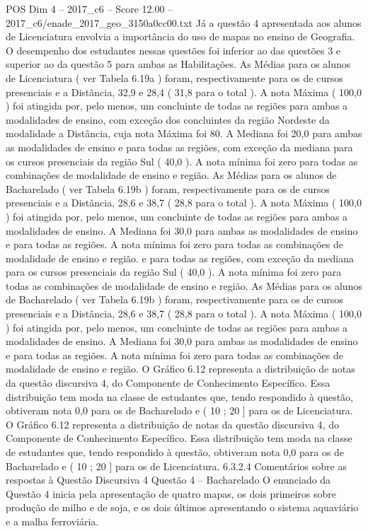 \begin{textsample}{POS Dim 4 – 2017\_c6 – Score 12.00 – 2017\_c6/enade\_2017\_geo\_3150a0cc00.txt}
Já a questão 4 apresentada aos alunos de Licenciatura envolvia a importância do uso de mapas no ensino de Geografia.
O desempenho dos estudantes nessas questões foi inferior ao das questões 3 e superior ao da questão 5 para ambas as Habilitações.
As Médias para os alunos de Licenciatura ( ver Tabela 6.19a ) foram, respectivamente para os de cursos presenciais e a Distância, 32,9 e 28,4 ( 31,8 para o total ).
A nota Máxima ( 100,0 ) foi atingida por, pelo menos, um concluinte de todas as regiões para ambas a modalidades de ensino, com exceção dos concluintes da região Nordeste da modalidade a Distância, cuja nota Máxima foi 80.
A Mediana foi 20,0 para ambas as modalidades de ensino e para todas as regiões, com exceção da mediana para os cursos presenciais da região Sul ( 40,0 ).
A nota mínima foi zero para todas as combinações de modalidade de ensino e região.
As Médias para os alunos de Bacharelado ( ver Tabela 6.19b ) foram, respectivamente para os de cursos presenciais e a Distância, 28,6 e 38,7 ( 28,8 para o total ).
A nota Máxima ( 100,0 ) foi atingida por, pelo menos, um concluinte de todas as regiões para ambas a modalidades de ensino.
A Mediana foi 30,0 para ambas as modalidades de ensino e para todas as regiões.
A nota mínima foi zero para todas as combinações de modalidade de ensino e região. e para todas as regiões, com exceção da mediana para os cursos presenciais da região Sul ( 40,0 ).
A nota mínima foi zero para todas as combinações de modalidade de ensino e região.
As Médias para os alunos de Bacharelado ( ver Tabela 6.19b ) foram, respectivamente para os de cursos presenciais e a Distância, 28,6 e 38,7 ( 28,8 para o total ).
A nota Máxima ( 100,0 ) foi atingida por, pelo menos, um concluinte de todas as regiões para ambas a modalidades de ensino.
A Mediana foi 30,0 para ambas as modalidades de ensino e para todas as regiões.
A nota mínima foi zero para todas as combinações de modalidade de ensino e região.
O Gráfico 6.12 representa a distribuição de notas da questão discursiva 4, do Componente de Conhecimento Específico.
Essa distribuição tem moda na classe de estudantes que, tendo respondido à questão, obtiveram nota 0,0 para os de Bacharelado e ( 10 ; 20 ] para os de Licenciatura.
O Gráfico 6.12 representa a distribuição de notas da questão discursiva 4, do Componente de Conhecimento Específico.
Essa distribuição tem moda na classe de estudantes que, tendo respondido à questão, obtiveram nota 0,0 para os de Bacharelado e ( 10 ; 20 ] para os de Licenciatura. 6.3.2.4 Comentários sobre as respostas à Questão Discursiva 4 Questão 4 – Bacharelado O enunciado da Questão 4 inicia pela apresentação de quatro mapas, os dois primeiros sobre produção de milho e de soja, e os dois últimos apresentando o sistema aquaviário e a malha ferroviária.

\end{textsample}
